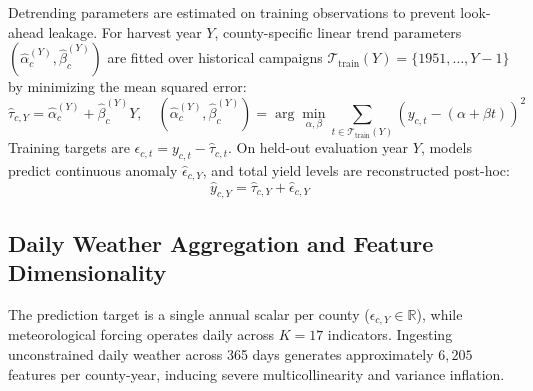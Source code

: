 Detrending parameters are estimated on training observations to prevent look-ahead leakage. For harvest year $Y$, county-specific linear trend parameters $(\hat{\alpha}_c^{(Y)}, \hat{\beta}_c^{(Y)})$ are fitted over historical campaigns $\mathcal{T}_{\text{train}}(Y) = \{1951, \dots, Y-1\}$ by minimizing the mean squared error:
\begin{equation}
    \hat{\tau}_{c,Y} = \hat{\alpha}_{c}^{(Y)} + \hat{\beta}_{c}^{(Y)} Y, \quad (\hat{\alpha}_{c}^{(Y)}, \hat{\beta}_{c}^{(Y)}) = \arg\min_{\alpha, \beta} \sum_{t \in \mathcal{T}_{\text{train}}(Y)} \left( y_{c,t} - (\alpha + \beta t) \right)^2
    \label{eq:train_only_trend}
\end{equation}
Training targets are $\epsilon_{c,t} = y_{c,t} - \hat{\tau}_{c,t}$. On held-out evaluation year $Y$, models predict continuous anomaly $\hat{\epsilon}_{c,Y}$, and total yield levels are reconstructed post-hoc:
\begin{equation}
    \hat{y}_{c,Y} = \hat{\tau}_{c,Y} + \hat{\epsilon}_{c,Y}
    \label{eq:yield_reconstruction}
\end{equation}

\subsection{Daily Weather Aggregation and Feature Dimensionality}
\label{sec:meth_temporal_mismatch}

The prediction target is a single annual scalar per county ($\epsilon_{c,Y} \in \mathbb{R}$), while meteorological forcing operates daily across $K = 17$ indicators. Ingesting unconstrained daily weather across 365 days generates approximately $6{,}205$ features per county-year, inducing severe multicollinearity and variance inflation.

